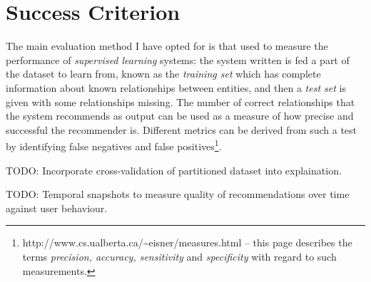 
\section{Success Criterion}

The main evaluation method I have opted for is that used to measure the performance of \textit{supervised learning} systems: the system written is fed a part of the dataset to learn from, known as the \textit{training set} which has complete information about known relationships between entities, and then a \textit{test set} is given with some relationships missing. The number of correct relationships that the system recommends as output can be used as a measure of how precise and successful the recommender is. Different metrics can be derived from such a test by identifying false negatives and false positives\footnote{http://www.cs.ualberta.ca/\textasciitilde eisner/measures.html -- this page describes the terms \textit{precision, accuracy, sensitivity} and \textit{specificity} with regard to such measurements.}. 

TODO: Incorporate cross-validation of partitioned dataset into explaination.

TODO: Temporal snapshots to measure quality of recommendations over time against user behaviour.



